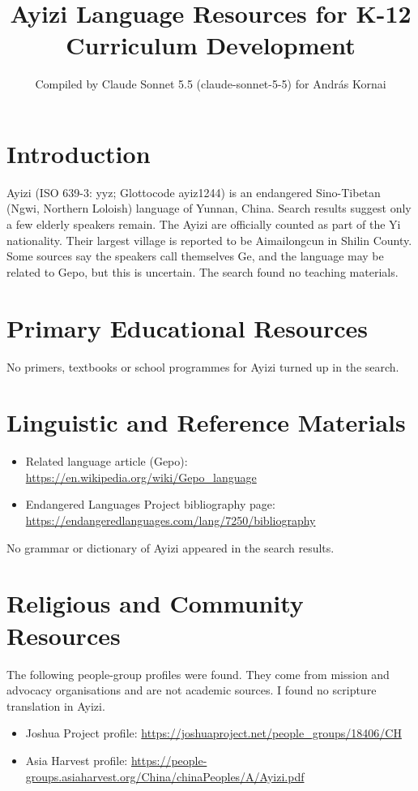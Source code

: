 \documentclass[12pt]{article}
\title{Ayizi Language Resources for K-12 Curriculum Development}
\author{Compiled by Claude Sonnet 5.5 (claude-sonnet-5-5) for Andr\'as Kornai}
\date{}
\begin{document}
\maketitle

\section{Introduction}
Ayizi (ISO 639-3: yyz; Glottocode ayiz1244) is an endangered Sino-Tibetan (Ngwi, Northern Loloish) language of Yunnan, China. Search results suggest only a few elderly speakers remain. The Ayizi are officially counted as part of the Yi nationality. Their largest village is reported to be Aimailongcun in Shilin County. Some sources say the speakers call themselves Ge, and the language may be related to Gepo, but this is uncertain. The search found no teaching materials.

\section{Primary Educational Resources}
No primers, textbooks or school programmes for Ayizi turned up in the search.

\section{Linguistic and Reference Materials}
\begin{itemize}
\item Related language article (Gepo): \url{https://en.wikipedia.org/wiki/Gepo_language}
\item Endangered Languages Project bibliography page: \url{https://endangeredlanguages.com/lang/7250/bibliography}
\end{itemize}
No grammar or dictionary of Ayizi appeared in the search results.

\section{Religious and Community Resources}
The following people-group profiles were found. They come from mission and advocacy organisations and are not academic sources. I found no scripture translation in Ayizi.
\begin{itemize}
\item Joshua Project profile: \url{https://joshuaproject.net/people_groups/18406/CH}
\item Asia Harvest profile: \url{https://people-groups.asiaharvest.org/China/chinaPeoples/A/Ayizi.pdf}
\end{itemize}
\end{document}
